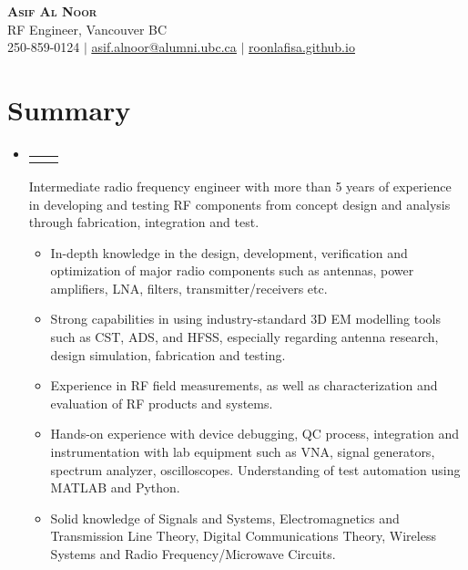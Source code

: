 \documentclass[letterpaper,11pt]{article}
\makeatletter
\newcommand{\resumeItem}[1]{
  \item\small{
    {#1 \vspace{-2pt}}
  }
}
\newcommand{\resumeProjectHeading}[2]{
    \item
    \begin{tabular*}{0.97\textwidth}{l@{\extracolsep{\fill}}r}
      \small#1 & #2 \\
    \end{tabular*}\vspace{-7pt}
}
\newcommand{\resumeSubHeadingListStart}{\begin{itemize}[leftmargin=0.15in, label={}]}
\newcommand{\resumeSubHeadingListEnd}{\end{itemize}}
\newcommand{\resumeItemListStart}{\begin{itemize}}
\newcommand{\resumeItemListEnd}{\end{itemize}\vspace{-5pt}}
\makeatother
\begin{document}


\begin{center}
    \textbf{\Huge \scshape Asif Al Noor} \\ \vspace{1pt}
     \small RF Engineer, Vancouver BC \\
    \small 250-859-0124 $|$ \href{mailto:asif.alnoor@alumni.ubc.ca}{\underline{asif.alnoor@alumni.ubc.ca}} $|$ 
    \href{https://roonlafisa.github.io/}{\underline{roonlafisa.github.io}}
\end{center}

\section{Summary}

\resumeSubHeadingListStart
    \resumeProjectHeading {}{}
    Intermediate radio frequency engineer with more than 5 years of experience in developing and testing RF components from concept design and analysis through fabrication, integration and test.
        \resumeItemListStart
        \resumeItem{In-depth knowledge in the design, development, verification and optimization of major radio components such as antennas, power amplifiers, LNA, filters, transmitter/receivers etc.}
        \resumeItem{Strong capabilities in using industry-standard 3D EM modelling tools such as CST, ADS, and HFSS, especially regarding antenna research, design simulation, fabrication and testing.}
        \resumeItem{Experience in RF field measurements, as well as characterization and evaluation of RF products and systems.}
        \resumeItem{Hands-on experience with device debugging, QC process, integration and instrumentation with lab equipment such as VNA, signal generators, spectrum analyzer, oscilloscopes. Understanding of test automation using MATLAB and Python.}
        \resumeItem{Solid knowledge of Signals and Systems, Electromagnetics and Transmission Line Theory, Digital Communications Theory, Wireless Systems and Radio Frequency/Microwave Circuits.}
        \resumeItemListEnd
\resumeSubHeadingListEnd
\end{document}
